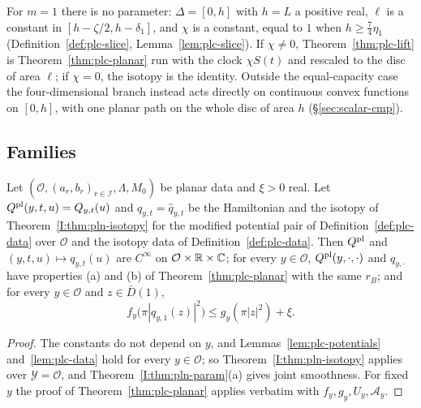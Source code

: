 \begin{remark}\label{rem:plc-scaling}
For $m=1$ there is no parameter: $\Delta=[0,h]$ with $h=L$ a positive real, $\ell$ is a constant in
$[h-\zeta/2,h-\delta_1]$, and $\chi$ is a constant, equal to $1$ when $h\ge\frac74\eta_1$ (Definition~\ref{def:plc-slice},
Lemma~\ref{lem:plc-slice}). If $\chi\ne0$, Theorem~\ref{thm:plc-lift} is Theorem~\ref{thm:plc-planar} run with the clock
$\chi S(t)$ and rescaled to the disc of area $\ell$; if $\chi=0$, the isotopy is the identity. Outside the
equal-capacity case the four-dimensional branch instead acts directly on continuous convex functions on $[0,h]$, with one
planar path on the whole disc of area $h$ (\S\ref{sec:scalar-cmp}).
\end{remark}

\subsection{Families}\label{sec:plc-param}

\begin{theorem}\label{thm:plc-param}
Let $(\mathcal O,(a_r,b_r)_{r\in\mathcal I},\Lambda,M_0)$ be planar data and $\xi>0$ real. Let $Q^{\rm pl}(y,t,u)=Q_{y,t}(u)$ and
$q_{y,t}=\hat q_{y,t}$ be the Hamiltonian and the isotopy of Theorem~\ref{I:thm:pln-isotopy} for the modified potential pair of
Definition~\ref{def:plc-data} over $\mathcal O$ and the isotopy data of Definition~\ref{def:plc-data}. Then
$Q^{\rm pl}$ and $(y,t,u)\mapsto q_{y,t}(u)$ are $C^\infty$ on $\mathcal O\times\mathbb{R}\times\mathbb{C}$; for every $y\in\mathcal O$,
$Q^{\rm pl}(y,\cdot,\cdot)$ and $q_{y,\cdot}$ have properties (a) and (b) of Theorem~\ref{thm:plc-planar} with the same $r_B$;
and for every $y\in\mathcal O$ and $z\in\bar D(1)$,
\[
 f_y\bigl(\pi|q_{y,1}(z)|^2\bigr)\le g_y(\pi|z|^2)+\xi .
\]
\end{theorem}

\begin{proof}
The constants do not depend on $y$, and Lemmas~\ref{lem:plc-potentials} and~\ref{lem:plc-data} hold for every
$y\in\mathcal O$; so Theorem~\ref{I:thm:pln-isotopy} applies over $\mathcal Y=\mathcal O$, and Theorem~\ref{I:thm:pln-param}(a) gives
joint smoothness. For fixed $y$ the proof of Theorem~\ref{thm:plc-planar} applies verbatim with $f_y,g_y,U_y,\mathcal A_y$.
\end{proof}

